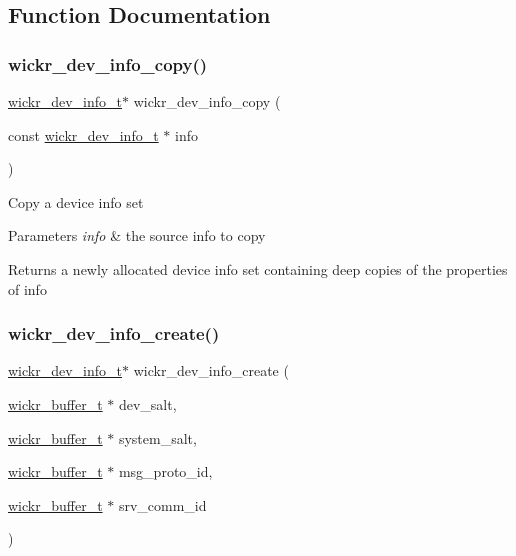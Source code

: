 \subsection{Function Documentation}
\mbox{\label{group__wickr__dev__info_ga1c9d2bdc1778166c49aec43906bb1a83}} 
\subsubsection{\texorpdfstring{wickr\+\_\+dev\+\_\+info\+\_\+copy()}{wickr\_dev\_info\_copy()}}
{\footnotesize\ttfamily \hyperlink{structwickr__dev__info}{wickr\+\_\+dev\+\_\+info\+\_\+t}$\ast$ wickr\+\_\+dev\+\_\+info\+\_\+copy (\begin{DoxyParamCaption}\item[{const \hyperlink{structwickr__dev__info}{wickr\+\_\+dev\+\_\+info\+\_\+t} $\ast$}]{info }\end{DoxyParamCaption})}

Copy a device info set


\begin{DoxyParams}{Parameters}
{\em info} & the source info to copy \\
\hline
\end{DoxyParams}
\begin{DoxyReturn}{Returns}
a newly allocated device info set containing deep copies of the properties of \textquotesingle{}info\textquotesingle{} 
\end{DoxyReturn}
\mbox{\label{group__wickr__dev__info_gaadd5ceb4c6ed757440332e8e27109e5e}} 
\subsubsection{\texorpdfstring{wickr\+\_\+dev\+\_\+info\+\_\+create()}{wickr\_dev\_info\_create()}}
{\footnotesize\ttfamily \hyperlink{structwickr__dev__info}{wickr\+\_\+dev\+\_\+info\+\_\+t}$\ast$ wickr\+\_\+dev\+\_\+info\+\_\+create (\begin{DoxyParamCaption}\item[{\hyperlink{structwickr__buffer}{wickr\+\_\+buffer\+\_\+t} $\ast$}]{dev\+\_\+salt,  }\item[{\hyperlink{structwickr__buffer}{wickr\+\_\+buffer\+\_\+t} $\ast$}]{system\+\_\+salt,  }\item[{\hyperlink{structwickr__buffer}{wickr\+\_\+buffer\+\_\+t} $\ast$}]{msg\+\_\+proto\+\_\+id,  }\item[{\hyperlink{structwickr__buffer}{wickr\+\_\+buffer\+\_\+t} $\ast$}]{srv\+\_\+comm\+\_\+id }\end{DoxyParamCaption})}

